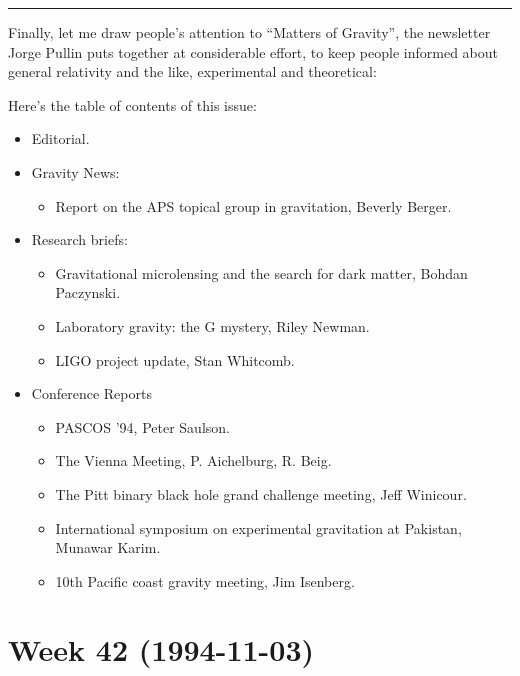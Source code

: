 \documentclass{article}
\def\tightlist{}
\renewcommand{\texttt}[1]{%
  \begingroup
  \ttfamily
  \begingroup\lccode`~=`/\lowercase{\endgroup\def~}{/\discretionary{}{}{}}%
  \begingroup\lccode`~=`[\lowercase{\endgroup\def~}{[\discretionary{}{}{}}%
  \begingroup\lccode`~=`.\lowercase{\endgroup\def~}{.\discretionary{}{}{}}%
  \catcode`/=\active\catcode`[=\active\catcode`.=\active
  \scantokens{#1\noexpand}%
  \endgroup
}
\begin{document}
\begin{center}\rule{0.5\linewidth}{0.5pt}\end{center}

Finally, let me draw people's attention to ``Matters of Gravity'', the
newsletter Jorge Pullin puts together at considerable effort, to keep
people informed about general relativity and the like, experimental and
theoretical:


Here's the table of contents of this issue:

\begin{itemize}
\tightlist
\item
  Editorial.
\item
  Gravity News:

  \begin{itemize}
  \tightlist
  \item
    Report on the APS topical group in gravitation, Beverly Berger.
  \end{itemize}
\item
  Research briefs:

  \begin{itemize}
  \tightlist
  \item
    Gravitational microlensing and the search for dark matter, Bohdan
    Paczynski.
  \item
    Laboratory gravity: the G mystery, Riley Newman.
  \item
    LIGO project update, Stan Whitcomb.
  \end{itemize}
\item
  Conference Reports

  \begin{itemize}
  \tightlist
  \item
    PASCOS '94, Peter Saulson.
  \item
    The Vienna Meeting, P. Aichelburg, R. Beig.
  \item
    The Pitt binary black hole grand challenge meeting, Jeff Winicour.
  \item
    International symposium on experimental gravitation at Pakistan,
    Munawar Karim.
  \item
    10th Pacific coast gravity meeting, Jim Isenberg.
  \end{itemize}
\end{itemize}
\hypertarget{week-42-1994-11-03}{%
\section{Week 42 (1994-11-03)}\label{week-42-1994-11-03}}
\end{document}
